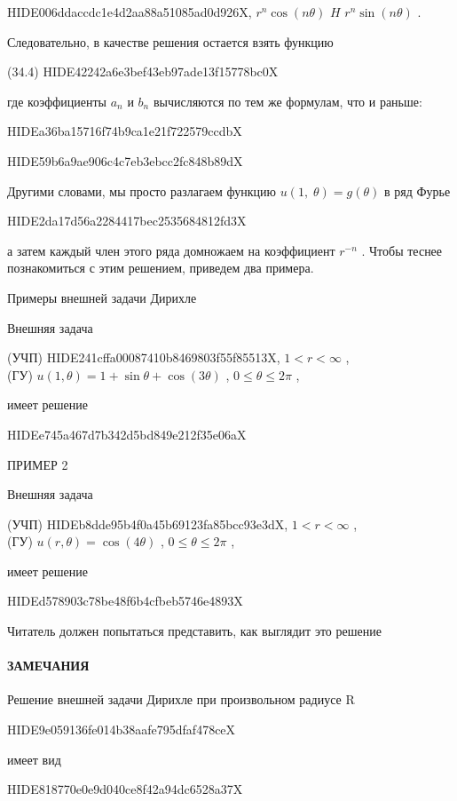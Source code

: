 \documentclass[
  ukrainian,
]{article}
\begin{document}
HIDE006ddaccdc1e4d2aa88a51085ad0d926X, \(r^n \cos(n\theta)\) \(H\)
\(r^n \sin(n\theta)\) .

Следовательно, в качестве решения остается взять функцию

(34.4) HIDE42242a6e3bef43eb97ade13f15778bc0X

где коэффициенты \(a_n\) и \(b_n\) вычисляются по тем же формулам, что и
раньше:

HIDEa36ba15716f74b9ca1e21f722579ccdbX

HIDE59b6a9ae906c4c7eb3ebcc2fc848b89dX

Другими словами, мы просто разлагаем функцию
\(u\left(1,\;\theta\right)=g\left(\theta\right)\) в ряд Фурье

HIDE2da17d56a2284417bec2535684812fd3X

а затем каждый член этого ряда домножаем на коэффициент \(r^{-n}\) .
Чтобы теснее познакомиться с этим решением, приведем два примера.

Примеры внешней задачи Дирихле

Внешняя задача

(УЧП) HIDE241cffa00087410b8469803f55f85513X, \(1 < r < \infty\) ,\\
(ГУ) \(u(1, \theta) = 1 + \sin \theta + \cos (3\theta)\) ,
\(0 \le \theta \le 2\pi\) ,

имеет решение

HIDEe745a467d7b342d5bd849e212f35e06aX

ПРИМЕР 2

Внешняя задача

(УЧП) HIDEb8dde95b4f0a45b69123fa85bcc93e3dX, \(1 < r < \infty\) ,\\
(ГУ) \(u(r, \theta) = \cos(4\theta)\) , \(0 \le \theta \le 2\pi\) ,

имеет решение

HIDEd578903c78be48f6b4cfbeb5746e4893X

Читатель должен попытаться представить, как выглядит это решение

\paragraph{ЗАМЕЧАНИЯ}\label{ux437ux430ux43cux435ux447ux430ux43dux438ux44f-1}

Решение внешней задачи Дирихле при произвольном радиусе R

HIDE9e059136fe014b38aafe795dfaf478ceX

имеет вид

HIDE818770e0e9d040ce8f42a94dc6528a37X
\end{document}
